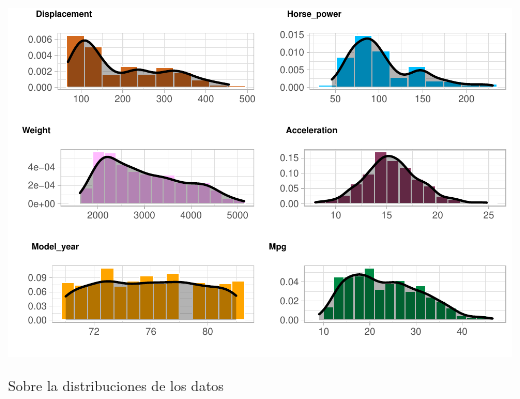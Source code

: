 \begin{center}\includegraphics{img/EDA_files/figure-latex/unnamed-chunk-7-7} \end{center}

Sobre la distribuciones de los datos

